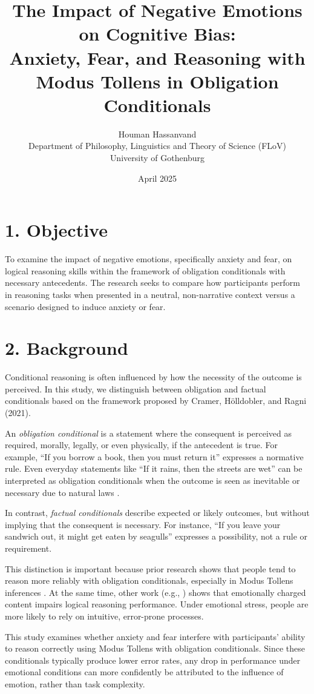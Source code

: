 \documentclass[12pt]{article}
\title{\textbf{The Impact of Negative Emotions on Cognitive Bias:\\ Anxiety, Fear, and Reasoning with Modus Tollens in Obligation Conditionals}}
\author{
Houman Hassanvand \\
Department of Philosophy, Linguistics and Theory of Science (FLoV) \\
University of Gothenburg
}
\date{April 2025}
\begin{document}
\maketitle

\section*{1. Objective}
To examine the impact of negative emotions, specifically anxiety and fear, on logical reasoning skills within the framework of obligation conditionals with necessary antecedents. The research seeks to compare how participants perform in reasoning tasks when presented in a neutral, non-narrative context versus a scenario designed to induce anxiety or fear.

\section*{2. Background}
Conditional reasoning is often influenced by how the necessity of the outcome is perceived. In this study, we distinguish between obligation and factual conditionals based on the framework proposed by Cramer, Hölldobler, and Ragni (2021).

An \textit{obligation conditional} is a statement where the consequent is perceived as required, morally, legally, or even physically, if the antecedent is true. For example, ``If you borrow a book, then you must return it'' expresses a normative rule. Even everyday statements like ``If it rains, then the streets are wet'' can be interpreted as obligation conditionals when the outcome is seen as inevitable or necessary due to natural laws \cite[p.~2338]{cramer2021modus}.

In contrast, \textit{factual conditionals} describe expected or likely outcomes, but without implying that the consequent is necessary. For instance, ``If you leave your sandwich out, it might get eaten by seagulls'' expresses a possibility, not a rule or requirement.

This distinction is important because prior research shows that people tend to reason more reliably with obligation conditionals, especially in Modus Tollens inferences \cite{cramer2021modus}. At the same time, other work (e.g., \cite{blanchette2010affect, goel2003emotion}) shows that emotionally charged content impairs logical reasoning performance. Under emotional stress, people are more likely to rely on intuitive, error-prone processes.

This study examines whether anxiety and fear interfere with participants’ ability to reason correctly using Modus Tollens with obligation conditionals. Since these conditionals typically produce lower error rates, any drop in performance under emotional conditions can more confidently be attributed to the influence of emotion, rather than task complexity.
\end{document}
